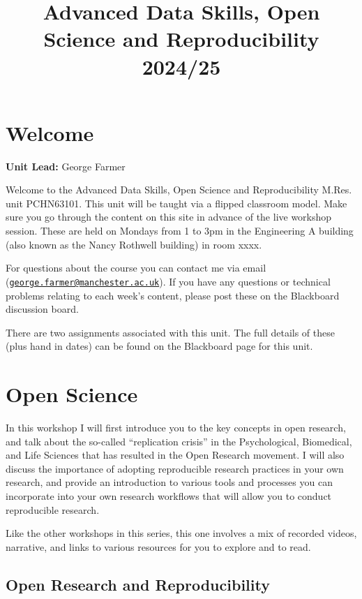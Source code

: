 \documentclass[
]{book}
\title{Advanced Data Skills, Open Science and Reproducibility 2024/25}
\author{}
\date{\vspace{-2.5em}}
\begin{document}
\maketitle

{
\setcounter{tocdepth}{1}
\tableofcontents
}
\hypertarget{welcome}{%
\chapter*{Welcome}\label{welcome}}

\textbf{Unit Lead:} George Farmer

Welcome to the Advanced Data Skills, Open Science and Reproducibility M.Res. unit PCHN63101. This unit will be taught via a flipped classroom model. Make sure you go through the content on this site in advance of the live workshop session. These are held on Mondays from 1 to 3pm in the Engineering A building (also known as the Nancy Rothwell building) in room xxxx.

For questions about the course you can contact me via email (\href{mailto:george.farmer@manchester.ac.uk}{\nolinkurl{george.farmer@manchester.ac.uk}}). If you have any questions or technical problems relating to each week's content, please post these on the Blackboard discussion board.

There are two assignments associated with this unit. The full details of these (plus hand in dates) can be found on the Blackboard page for this unit.

\hypertarget{open-science}{%
\chapter{Open Science}\label{open-science}}

In this workshop I will first introduce you to the key concepts in open research, and talk about the so-called ``replication crisis'' in the Psychological, Biomedical, and Life Sciences that has resulted in the Open Research movement. I will also discuss the importance of adopting reproducible research practices in your own research, and provide an introduction to various tools and processes you can incorporate into your own research workflows that will allow you to conduct reproducible research.

Like the other workshops in this series, this one involves a mix of recorded videos, narrative, and links to various resources for you to explore and to read.

\hypertarget{open-research-and-reproducibility}{%
\section{Open Research and Reproducibility}\label{open-research-and-reproducibility}}
\end{document}
